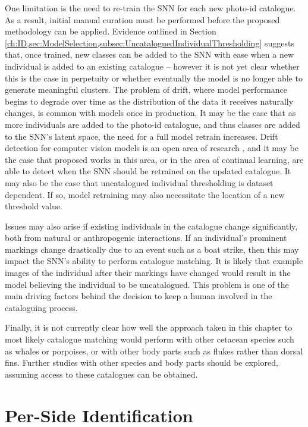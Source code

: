 One limitation is the need to re-train the SNN for each new photo-id catalogue. As a result, initial manual curation must be performed before the proposed methodology can be applied. Evidence outlined in Section \ref{ch:ID,sec:ModelSelection,subsec:UncataloguedIndividualThresholding} suggests that, once trained, new classes can be added to the SNN with ease when a new individual is added to an existing catalogue -- however it is not yet clear whether this is the case in perpetuity or whether eventually the model is no longer able to generate meaningful clusters. The problem of drift, where model performance begins to degrade over time as the distribution of the data it receives naturally changes, is common with models once in production. It may be the case that as more individuals are added to the photo-id catalogue, and thus classes are added to the SNN's latent space, the need for a full model retrain increases. Drift detection for computer vision models is an open area of research \cite{siva_weakly_2011, suprem_odin_2020, nagar_concept_2020, cobb_context-aware_2022}, and it may be the case that proposed works in this area, or in the area of continual learning, are able to detect when the SNN should be retrained on the updated catalogue. It may also be the case that uncatalogued individual thresholding is dataset dependent. If so, model retraining may also necessitate the location of a new threshold value.  

Issues may also arise if existing individuals in the catalogue change significantly, both from natural or anthropogenic interactions. If an individual's prominent markings change drastically due to an event such as a boat strike, then this may impact the SNN's ability to perform catalogue matching. It is likely that example images of the individual after their markings have changed would result in the model believing the individual to be uncatalogued. This problem is one of the main driving factors behind the decision to keep a human involved in the cataloguing process.

Finally, it is not currently clear how well the approach taken in this chapter to most likely catalogue matching would perform with other cetacean species such as whales or porpoises, or with other body parts such as flukes rather than dorsal fins. Further studies with other species and body parts should be explored, assuming access to these catalogues can be obtained. 

\section{Per-Side Identification}\label{ch:ID,sec:perSide}

